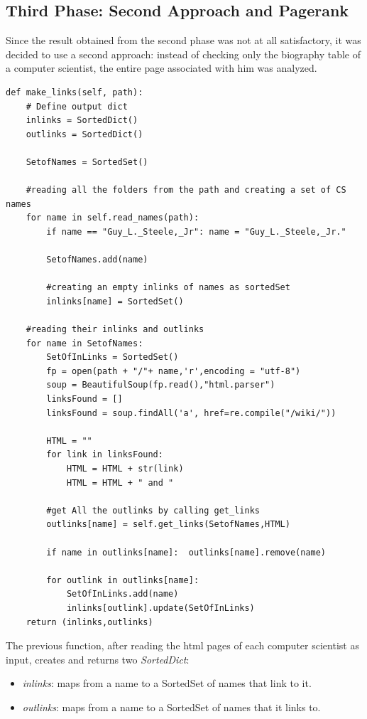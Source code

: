 \documentclass[12pt, twoside]{article}
\begin{document}
\newpage
\subsection{Third Phase: Second Approach and Pagerank}
Since the result obtained from the second phase was not at all satisfactory, it was decided to use a second approach: instead of checking only the biography table of a computer scientist, the entire page associated with him was analyzed.
\vspace{6pt}
\begin{lstlisting}[language = iPython, caption={Making Links},captionpos=b]
def make_links(self, path):
	# Define output dict
	inlinks = SortedDict() 
	outlinks = SortedDict()

	SetofNames = SortedSet()

	#reading all the folders from the path and creating a set of CS names
	for name in self.read_names(path):
		if name == "Guy_L._Steele,_Jr":	name = "Guy_L._Steele,_Jr."

		SetofNames.add(name)

		#creating an empty inlinks of names as sortedSet
		inlinks[name] = SortedSet()

	#reading their inlinks and outlinks
	for name in SetofNames:
		SetOfInLinks = SortedSet()
		fp = open(path + "/"+ name,'r',encoding = "utf-8")
		soup = BeautifulSoup(fp.read(),"html.parser")
		linksFound = []
		linksFound = soup.findAll('a', href=re.compile("/wiki/"))

		HTML = ""
		for link in linksFound:
			HTML = HTML + str(link)
			HTML = HTML + " and "

		#get All the outlinks by calling get_links
		outlinks[name] = self.get_links(SetofNames,HTML)

		if name in outlinks[name]:	outlinks[name].remove(name)

		for outlink in outlinks[name]:
			SetOfInLinks.add(name)
			inlinks[outlink].update(SetOfInLinks)
	return (inlinks,outlinks)
\end{lstlisting}
The previous function, after reading the html pages of each computer scientist as input, creates and returns two \textit{SortedDict}:
\begin{itemize}[noitemsep, topsep=0pt]
	\item \textit{inlinks}: maps from a name to a SortedSet of names that link to it.
	\item \textit{outlinks}: maps from a name to a SortedSet of names that it links to.
\end{itemize}
\end{document}

